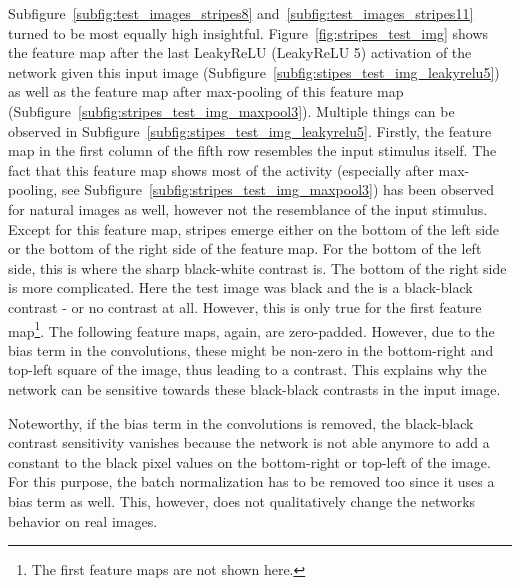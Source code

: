 Subfigure~\ref{subfig:test_images_stripes8} and~\ref{subfig:test_images_stripes11} turned to be most equally high insightful.
Figure~\ref{fig:stripes_test_img} shows the feature map after the last LeakyReLU (LeakyReLU 5) activation of the network given this input image (Subfigure~\ref{subfig:stipes_test_img_leakyrelu5}) as well as the feature map after max-pooling of this feature map (Subfigure~\ref{subfig:stripes_test_img_maxpool3}).
Multiple things can be observed in Subfigure~\ref{subfig:stipes_test_img_leakyrelu5}.
Firstly, the feature map in the first column of the fifth row resembles the input stimulus itself.
The fact that this feature map shows most of the activity (especially after max-pooling, see Subfigure~\ref{subfig:stripes_test_img_maxpool3}) has been observed for natural images as well, however not the resemblance of the input stimulus.
Except for this feature map, stripes emerge either on the bottom of the left side or the bottom of the right side of the feature map.
For the bottom of the left side, this is where the sharp black-white contrast is.
The bottom of the right side is more complicated.
Here the test image was black and the  is a black-black contrast - or no contrast at all.
However, this is only true for the first feature map\footnote{The first feature maps are not shown here.}.
The following feature maps, again, are zero-padded.
However, due to the bias term in the convolutions, these might be non-zero in the bottom-right and top-left square of the image, thus leading to a contrast.
This explains why the network can be sensitive towards these black-black contrasts in the input image.

Noteworthy, if the bias term in the convolutions is removed, the black-black contrast sensitivity vanishes because the network is not able anymore to add a constant to the black pixel values on the bottom-right or top-left of the image.
For this purpose, the batch normalization has to be removed too since it uses a bias term as well.
This, however, does not qualitatively change the networks behavior on real images.


